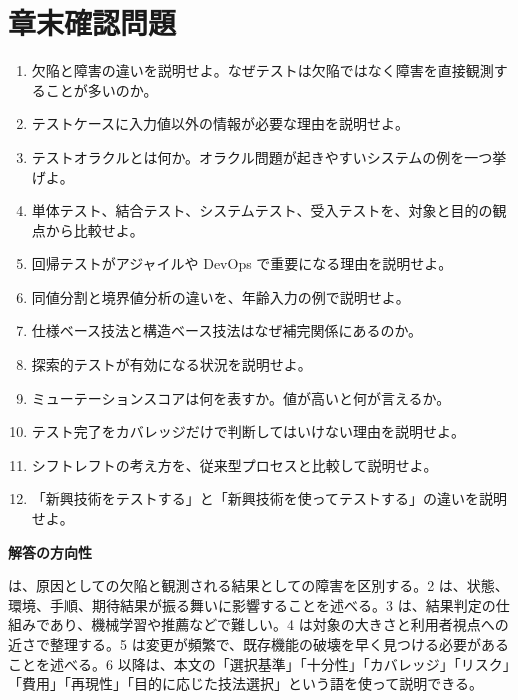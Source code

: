 \documentclass[uplatex,dvipdfmx,a4paper,11pt,nomag]{jsarticle}
\newenvironment{pointbox}[1]{\par\medskip\begin{shaded}\noindent\textbf{#1}\par\smallskip\noindent}{\end{shaded}\par\medskip}
\begin{document}
\section{章末確認問題}
\begin{enumerate}[leftmargin=2em]
\item 欠陥と障害の違いを説明せよ。なぜテストは欠陥ではなく障害を直接観測することが多いのか。
\item テストケースに入力値以外の情報が必要な理由を説明せよ。
\item テストオラクルとは何か。オラクル問題が起きやすいシステムの例を一つ挙げよ。
\item 単体テスト、結合テスト、システムテスト、受入テストを、対象と目的の観点から比較せよ。
\item 回帰テストがアジャイルや DevOps で重要になる理由を説明せよ。
\item 同値分割と境界値分析の違いを、年齢入力の例で説明せよ。
\item 仕様ベース技法と構造ベース技法はなぜ補完関係にあるのか。
\item 探索的テストが有効になる状況を説明せよ。
\item ミューテーションスコアは何を表すか。値が高いと何が言えるか。
\item テスト完了をカバレッジだけで判断してはいけない理由を説明せよ。
\item シフトレフトの考え方を、従来型プロセスと比較して説明せよ。
\item 「新興技術をテストする」と「新興技術を使ってテストする」の違いを説明せよ。
\end{enumerate}

\begin{pointbox}{解答の方向性}
1 は、原因としての欠陥と観測される結果としての障害を区別する。2 は、状態、環境、手順、期待結果が振る舞いに影響することを述べる。3 は、結果判定の仕組みであり、機械学習や推薦などで難しい。4 は対象の大きさと利用者視点への近さで整理する。5 は変更が頻繁で、既存機能の破壊を早く見つける必要があることを述べる。6 以降は、本文の「選択基準」「十分性」「カバレッジ」「リスク」「費用」「再現性」「目的に応じた技法選択」という語を使って説明できる。
\end{pointbox}
\end{document}
